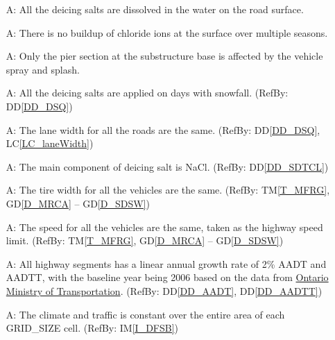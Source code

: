 \documentclass[12pt]{article}
\newcommand{\dref}[1]{GD\ref{#1}}
\newcommand{\ddref}[1]{DD\ref{#1}}
\newcommand{\tref}[1]{TM\ref{#1}}
\newcounter{assumpnum} %
\newcommand{\iref}[1]{IM\ref{#1}}
\newcommand{\lcref}[1]{LC\ref{#1}}
\begin{document}
\begin{itemize}
\item[A\refstepcounter{assumpnum}\theassumpnum \label{A_dissolve}:] All the deicing salts are dissolved in the water on the road surface.

\item[A\refstepcounter{assumpnum}\theassumpnum \label{A_buildup}:] There is no buildup of chloride ions at the surface over multiple seasons.

\item[A\refstepcounter{assumpnum}\theassumpnum \label{A_pier}:] Only the pier section at the substructure base is affected by the vehicle spray and splash.

\item[A\refstepcounter{assumpnum}\theassumpnum \label{A_deicingSalts}:] All the deicing salts are applied on days with snowfall. (RefBy: \ddref{DD_DSQ})

\item[A\refstepcounter{assumpnum}\theassumpnum \label{A_laneWidth}:] The lane width for all the roads are the same. (RefBy: \ddref{DD_DSQ}, \lcref{LC_laneWidth})

\item[A\refstepcounter{assumpnum}\theassumpnum \label{A_NaCl}:] The main component of deicing salt is NaCl. (RefBy: \ddref{DD_SDTCL})

\item[A\refstepcounter{assumpnum}\theassumpnum \label{A_tireWidth}:] The tire width for all the vehicles are the same. (RefBy: \tref{T_MFRG},  \dref{D_MRCA} -- \dref{D_SDSW})

\item[A\refstepcounter{assumpnum}\theassumpnum \label{A_Speed}:] The speed for all the vehicles are the same, taken as the highway speed limit. (RefBy: \tref{T_MFRG}, \dref{D_MRCA} -- \dref{D_SDSW})

\item[A\refstepcounter{assumpnum}\theassumpnum \label{A_LinearGrowthTraffic}:]  All highway segments has a linear annual growth rate of 2\% AADT and AADTT, with the baseline year being 2006 based on the data from \href{https://icorridor-mto-on-ca.hub.arcgis.com/apps/50798e771bd0440dbc96fd85d8fde9a5/explore}{Ontario Ministry of Transportation}. (RefBy: \ddref{DD_AADT}, \ddref{DD_AADTT})

\item[A\refstepcounter{assumpnum}\theassumpnum \label{A_Data}:] The climate and traffic is constant over the entire area of each GRID\_SIZE cell. (RefBy: \iref{I_DFSB})


\end{itemize}
\end{document}
